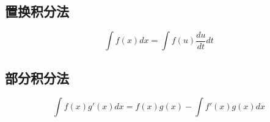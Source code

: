 \subsection{置换积分法}

\begin{equation*}
    \int f(x)dx=\int f(u)\frac{du}{dt}dt
\end{equation*}

\subsection{部分积分法}

\begin{equation*}
    \int f(x)g'(x)dx=f(x)g(x)-\int f'(x)g(x)dx
\end{equation*}

